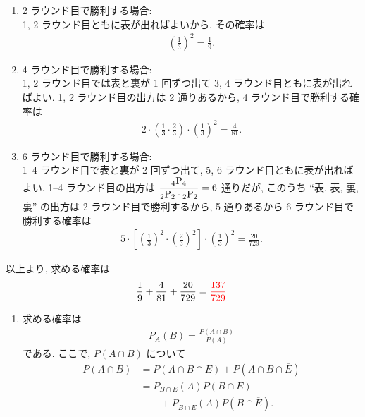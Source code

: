 \begin{qenumerate}
{\begin{enumerate}
{				\begin{enumerate}
					\item{
						2 ラウンド目で勝利する場合: \\
						1, 2 ラウンド目ともに表が出ればよいから, その確率は
						\begin{align}
							\left(\frac{1}{3}\right)^{2} = \frac{1}{9}.
						\end{align}
					}
					\item{
						4 ラウンド目で勝利する場合: \\
						1, 2 ラウンド目では表と裏が 1 回ずつ出て 3, 4 ラウンド目ともに表が出ればよい.
						1, 2 ラウンド目の出方は 2 通りあるから, 4 ラウンド目で勝利する確率は
						\begin{align}
							2\cdot\left(\frac{1}{3}\cdot\frac{2}{3}\right) \cdot \left(\frac{1}{3}\right)^{2} = \frac{4}{81}.
						\end{align}
					}
					\item{
						6 ラウンド目で勝利する場合: \\
						1--4 ラウンド目で表と裏が 2 回ずつ出て, 5, 6 ラウンド目ともに表が出ればよい.
						1--4 ラウンド目の出方は $\dfrac{{{}_{4}\mathrm{P}_{4}}}{{{}_{2}\mathrm{P}_{2}}\cdot{{}_{2}\mathrm{P}_{2}}} = 6$ 通りだが, このうち ``表, 表, 裏, 裏'' の出方は 2 ラウンド目で勝利するから, 5 通りあるから 6 ラウンド目で勝利する確率は
						\begin{align}
							5\cdot\left[\left(\frac{1}{3}\right)^{2}\cdot\left(\frac{2}{3}\right)^{2}\right]\cdot\left(\frac{1}{3}\right)^{2} = \frac{20}{729}.
						\end{align}
					}
				\end{enumerate}
				以上より, 求める確率は
				\begin{align}
					\frac{1}{9} + \frac{4}{81} + \frac{20}{729} = \textcolor{red}{\frac{137}{729}}.
				\end{align}
			}
		\end{enumerate}
	}
	\item{
		\begin{enumerate}
			\item{
				求める確率は
				\begin{align}
					P_{A}(B) = \frac{P(A\cap B)}{P(A)}
				\end{align}
				である.
				ここで, $P(A\cap B)$ について
				\begin{align}
					P(A\cap B) &= P(A\cap B\cap E) + P\left(A\cap B\cap \overline{E}\right) \\
						&= P_{B\cap E}(A)P(B\cap E) \\
						&\quad\quad{} + P_{B\cap\overline{E}}(A)P\left(B\cap\overline{E}\right).

\end{align}}
\end{enumerate}}
\end{qenumerate}
